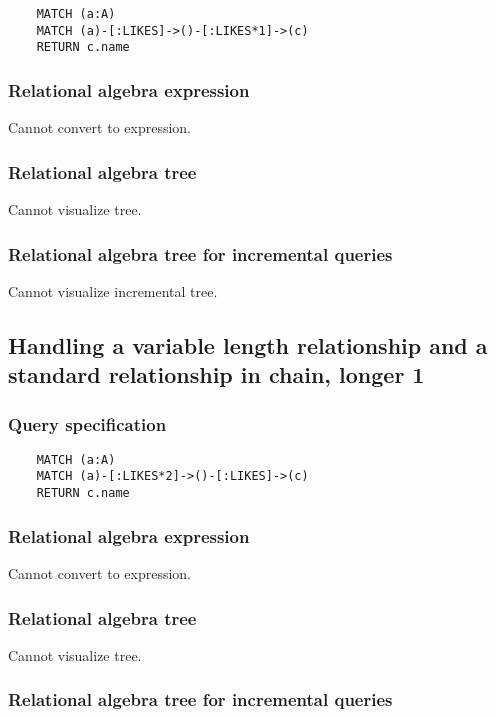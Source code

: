 	\begin{lstlisting}
	MATCH (a:A)
	MATCH (a)-[:LIKES]->()-[:LIKES*1]->(c)
	RETURN c.name
	\end{lstlisting}


	\subsubsection*{Relational algebra expression}

	Cannot convert to expression.

	\subsubsection*{Relational algebra tree}

	Cannot visualize tree.

	\subsubsection*{Relational algebra tree for incremental queries}

	Cannot visualize incremental tree.
	\subsection{Handling a variable length relationship and a standard relationship in chain, longer 1}

	\subsubsection*{Query specification}

	\begin{lstlisting}
	MATCH (a:A)
	MATCH (a)-[:LIKES*2]->()-[:LIKES]->(c)
	RETURN c.name
	\end{lstlisting}


	\subsubsection*{Relational algebra expression}

	Cannot convert to expression.

	\subsubsection*{Relational algebra tree}

	Cannot visualize tree.

	\subsubsection*{Relational algebra tree for incremental queries}

